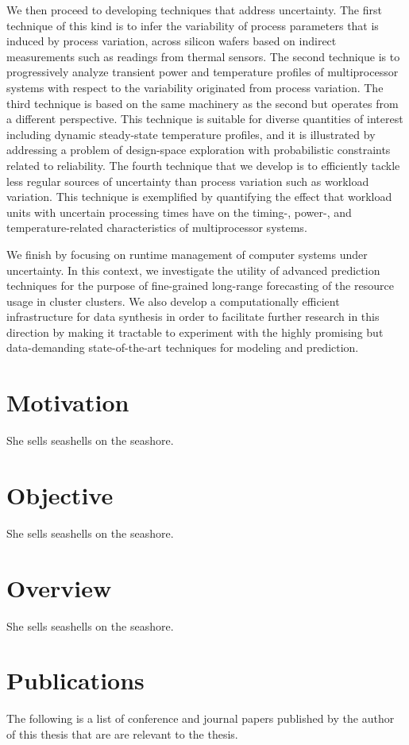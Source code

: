 We then proceed to developing techniques that address uncertainty. The first
technique of this kind is to infer the variability of process parameters that is
induced by process variation, across silicon wafers based on indirect
measurements such as readings from thermal sensors. The second technique is to
progressively analyze transient power and temperature profiles of multiprocessor
systems with respect to the variability originated from process variation. The
third technique is based on the same machinery as the second but operates from a
different perspective. This technique is suitable for diverse quantities of
interest including dynamic steady-state temperature profiles, and it is
illustrated by addressing a problem of design-space exploration with
probabilistic constraints related to reliability. The fourth technique that we
develop is to efficiently tackle less regular sources of uncertainty than
process variation such as workload variation. This technique is exemplified by
quantifying the effect that workload units with uncertain processing times have
on the timing-, power-, and temperature-related characteristics of
multiprocessor systems.

We finish by focusing on runtime management of computer systems under
uncertainty. In this context, we investigate the utility of advanced prediction
techniques for the purpose of fine-grained long-range forecasting of the
resource usage in cluster clusters. We also develop a computationally efficient
infrastructure for data synthesis in order to facilitate further research in
this direction by making it tractable to experiment with the highly promising
but data-demanding state-of-the-art techniques for modeling and prediction.

\section{Motivation}
She sells seashells on the seashore.

\section{Objective}
She sells seashells on the seashore.

\section{Overview}
She sells seashells on the seashore.

\section{Publications}
The following is a list of conference and journal papers published by the author
of this thesis that are are relevant to the thesis.

\printbibliography[heading=none,keyword=own]
